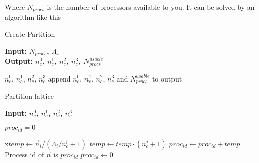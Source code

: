 \documentclass[a4paper,10pt]{article}
\begin{document}
Where $N_{procs}$ is the number of processors available to you. It can be solved by an algorithm like this
\begin{algorithm}[H]
\caption{Create Partition}\label{alg:Create_partition}
\hspace*{\algorithmicindent} \textbf{Input: $N_{procs}$, $\Lambda_x$} \\
\hspace*{\algorithmicindent} \textbf{Output: $n^0_c$, $n^1_c$, $n^2_c$, $n^3_c$, $N^{usable}_{procs}$}
\begin{algorithmic}
\State $n^0_c,\,n^1_c,\,n^2_c,\,n^3_c$
\State append $n^0_c,\,n^1_c,\,n^2_c,\,n^3_c$ and $N^{usable}_{procs}$ to output
\EndIf
\EndFor

\end{algorithmic}
\end{algorithm}


\begin{algorithm}[H]
\caption{Partition lattice}\label{alg:Partition_Lattice}
\hspace*{\algorithmicindent} \textbf{Input: $n^0_c$, $n^1_c$, $n^2_c$, $n^3_c$}
\begin{algorithmic}
\Ensure
\State $proc_{id} = 0$

x\State $temp \gets \vec{n}_i/(\Lambda_i/n^i_c+1)$
\State $temp \gets temp\cdot(n^j_c+1)$
\EndFor
\State $proc_{id} \gets proc_{id}+ temp$
\EndFor
\State \Return Process id of $\vec{n}$ is $proc_{id}$
\State $proc_{id}\gets 0$
\EndFor

\end{algorithmic}
\end{algorithm}
\end{document}
